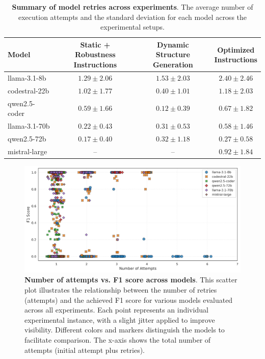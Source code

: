 \documentclass{DESSThesis}
\begin{document}
\begin{table}[h]
    \centering
    \renewcommand{\arraystretch}{1.2}
    \setlength{\tabcolsep}{10pt}
    \begin{tabular}{lccc}
        \hline
        \textbf{Model} & 
        \makecell{\textbf{Static + Robustness} \\ \textbf{Instructions}} & 
        \makecell{\textbf{Dynamic Structure} \\ \textbf{Generation}} & 
        \makecell{\textbf{Optimized} \\ \textbf{Instructions}} \\
        \hline
        llama-3.1-8b & $1.29 \pm 2.06$ & $1.53 \pm 2.03$ & $2.40 \pm 2.46$ \\
        codestral-22b & $1.02 \pm 1.77$ & $0.40 \pm 1.01$ & $1.18 \pm 2.03$ \\
        qwen2.5-coder & $0.59 \pm 1.66$ & $0.12 \pm 0.39$ & $0.67 \pm 1.82$ \\
        llama-3.1-70b & $0.22 \pm 0.43$ & $0.31 \pm 0.53$ & $0.58 \pm 1.46$ \\
        qwen2.5-72b & $0.17 \pm 0.40$ & $0.32 \pm 1.18$ & $0.27 \pm 0.58$ \\
        mistral-large & – & – & $0.92 \pm 1.84$ \\
        \hline
    \end{tabular}
    \caption[Summary of model retries across experiments]{\textbf{Summary of model retries across experiments}. The average number of execution attempts and the standard deviation for each model across the experimental setups.}
    \label{tab:retry_mean_and_st_deviation_second}
\end{table}

\begin{figure}[ht]
    \centering
    \includegraphics[width=\linewidth]{img/Results/Second Experimental Phase/Number of Retries vs F1 Score.png}
    \caption[Number of attempts vs. F1 score across models]{\textbf{Number of attempts vs. F1 score across models}. This scatter plot illustrates the relationship between the number of retries (attempts) and the achieved F1 score for various models evaluated across all experiments. Each point represents an individual experimental instance, with a slight jitter applied to improve visibility. Different colors and markers distinguish the models to facilitate comparison. The x-axis shows the total number of attempts (initial attempt plus retries).}
    \label{fig:retries_vs_F1_second}
\end{figure}
\end{document}
